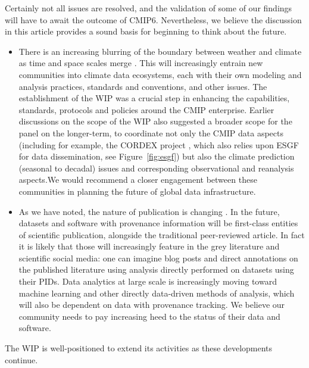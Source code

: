 \documentclass[gmd,manuscript]{copernicus}
\newcommand{\pllabel}[1]{\label{p-#1}\linelabel{l-#1}}
\begin{document}
Certainly not all issues are resolved, and the validation of some of
our findings will have to await the outcome of CMIP6. Nevertheless, we
believe the discussion in this article provides a sound basis for
beginning to think about the future.

\begin{itemize}
\item There is an increasing blurring of the boundary between weather
  and climate as time and space scales merge \citep{ref:hoskins2013}.
  This will increasingly entrain new communities into
  \pllabel{RC1-64}
  climate data ecosystems, each with their own modeling and analysis
  practices, standards and conventions, and other issues. The
  establishment of the WIP was a crucial step in enhancing the
  capabilities, standards, protocols and policies around the CMIP
  enterprise. Earlier discussions on the scope of the WIP also
  suggested a broader scope for the panel on the longer-term, to
  coordinate not only the CMIP data aspects (including for example,
  the CORDEX project \citep{ref:lakeetal2017}, which also relies upon
  ESGF for data dissemination, see Figure~\ref{fig:esgf}) but also the
  climate prediction (seasonal to decadal) issues and corresponding
  observational and reanalysis aspects.We would recommend a closer
  engagement between these communities in planning the future of
  global data infrastructure.
\item As we have noted, the nature of publication is changing
  \citep[see e.g][]{ref:davidetal2016}. In the future, datasets and
  software with provenance information will be first-class entities of
  scientific publication, alongside the traditional peer-reviewed
  article. In fact it is likely that those will increasingly feature
  in the grey literature and scientific social media: one can imagine
  blog posts and direct annotations on the published literature using
  analysis directly performed on datasets using their PIDs. Data
  analytics at large scale is increasingly moving toward machine
  learning and other directly data-driven methods of analysis, which
  will also be dependent on data with provenance tracking. We believe
  our community needs to pay increasing heed to the status of their
  data and software.
\end{itemize}

The WIP is well-positioned to extend its activities as these
developments continue.
\end{document}
